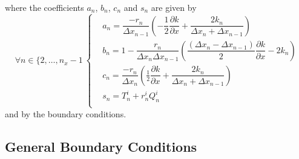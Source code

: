 \documentclass[sn-vancouver, Numbered]{sn-jnl}
\begin{document}
where the coefficients $a_n$, $b_n$, $c_n$ and $s_n$ are given by
\begin{equation}
\forall n \in \{2, \dots, n_x-1 \ 
\begin{cases}
& a_n =   \dfrac{-r_n}{\Delta x_{n-1}} \left( - \dfrac{1}{2} \dfrac{\partial k}{ \partial x} + \dfrac{2 k_n}{\Delta x_n + \Delta x_{n-1}} \right) \\
& b_n = 1 - \dfrac{r_n}{\Delta x_{n}\Delta x_{n-1}} \left( \dfrac{\left(\Delta x_{n}- \Delta x_{n-1} \right)}{2} \dfrac{\partial k}{ \partial x} - 2 k_n \right) \\
& c_n =  \dfrac{-r_n}{\Delta x_{n}} \left( \frac{1}{2} \dfrac{\partial k}{ \partial x} + \dfrac{2 k_n}{\Delta x_n + \Delta x_{n-1}} \right)\\
& s_n = T_n^i + r_n^i Q_n^i\\
\end{cases}
\end{equation}
and by the boundary conditions.


\subsection{General Boundary Conditions}
\end{document}

